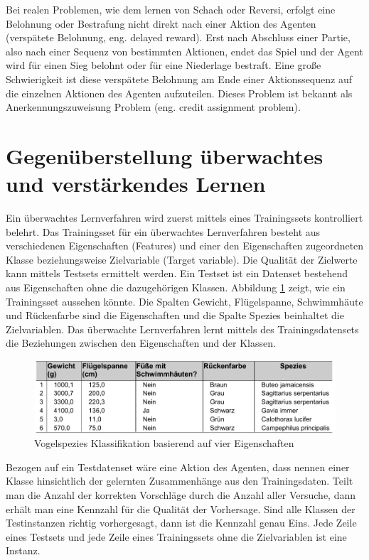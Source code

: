 Bei realen Problemen, wie dem lernen von Schach oder Reversi, erfolgt eine Belohnung oder Bestrafung nicht direkt nach einer Aktion des Agenten (verspätete Belohnung, eng. delayed reward). Erst nach Abschluss einer Partie, also nach einer Sequenz von bestimmten Aktionen, endet das Spiel und der Agent wird für einen Sieg belohnt oder für eine Niederlage bestraft. Eine große Schwierigkeit ist diese verspätete Belohnung am Ende einer Aktionssequenz auf die einzelnen Aktionen des Agenten aufzuteilen. Dieses Problem ist bekannt als Anerkennungszuweisung Problem (eng. credit assignment problem). \\

\section{Gegenüberstellung überwachtes und verstärkendes Lernen}
Ein überwachtes Lernverfahren wird zuerst mittels eines Trainingssets kontrolliert belehrt. Das Trainingsset für ein überwachtes Lernverfahren besteht aus verschiedenen Eigenschaften (Features) und einer den Eigenschaften zugeordneten Klasse beziehungsweise Zielvariable (Target variable). Die Qualität der Zielwerte kann mittels Testsets ermittelt werden. Ein Testset ist ein Datenset bestehend aus Eigenschaften ohne die dazugehörigen Klassen. Abbildung \ref{fig:vogel_spezies} zeigt, wie ein Trainingsset aussehen könnte\cite[8]{Harrington}. Die Spalten Gewicht, Flügelspanne, Schwimmhäute und Rückenfarbe sind die Eigenschaften und die Spalte Spezies beinhaltet die Zielvariablen. Das überwachte Lernverfahren lernt mittels des Trainingsdatensets die Beziehungen zwischen den Eigenschaften und der Klassen. \\

\begin{figure}[!htbp]
  \centering
  \includegraphics[scale = 0.89]{inhalt/abbildungen/vogel_spezies.pdf}
  \caption{Vogelspezies Klassifikation basierend auf vier Eigenschaften}
  \label{fig:vogel_spezies}
\end{figure} 

Bezogen auf ein Testdatenset wäre eine Aktion des Agenten, dass nennen einer Klasse hinsichtlich der gelernten Zusammenhänge aus den Trainingsdaten. Teilt man die Anzahl der korrekten Vorschläge durch die Anzahl aller Versuche, dann erhält man eine Kennzahl für die Qualität der Vorhersage. Sind alle Klassen der Testinstanzen richtig vorhergesagt, dann ist die Kennzahl genau Eins. Jede Zeile eines Testsets und jede Zeile eines Trainingssets ohne die Zielvariablen ist eine Instanz. \\

